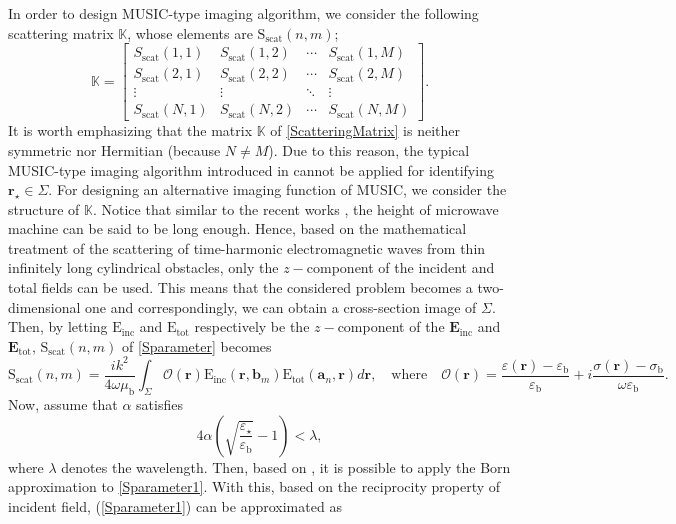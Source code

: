 \documentclass[3p,10pt]{elsarticle}
\newcommand{\eps}{\varepsilon}
\newcommand{\epsb}{\varepsilon_\mathrm{b}}
\newcommand{\mub}{\mu_\mathrm{b}}
\newcommand{\sigmab}{\sigma_\mathrm{b}}
\newcommand{\E}{\mathrm{E}}
\newcommand{\ma}{\mathbf{a}}
\newcommand{\mb}{\mathbf{b}}
\newcommand{\mr}{\mathbf{r}}
\newcommand{\mE}{\mathbf{E}}
\DeclareMathOperator*{\inc}{inc}
\DeclareMathOperator*{\scat}{scat}
\DeclareMathOperator*{\tot}{tot}
\theoremstyle{plain}
\theoremstyle{remark}
\begin{document}
In order to design MUSIC-type imaging algorithm, we consider the following scattering matrix $\mathbb{K}$, whose elements are $\mathrm{S}_{\scat}(n,m)$;
\begin{equation}\label{ScatteringMatrix}
\mathbb{K}=\begin{bmatrix}
S_{\scat}(1,1) & S_{\scat}(1,2) & \cdots & S_{\scat}(1,M) \\
S_{\scat}(2,1) & S_{\scat}(2,2) & \cdots & S_{\scat}(2,M) \\
\vdots & \vdots & \ddots & \vdots \\
S_{\scat}(N,1) & S_{\scat}(N,2) & \cdots & S_{\scat}(N,M)
\end{bmatrix}.
\end{equation}
It is worth emphasizing that the matrix $\mathbb{K}$ of \eqref{ScatteringMatrix} is neither symmetric nor Hermitian (because $N\ne M$). Due to this reason, the typical MUSIC-type imaging algorithm introduced in \cite{AILP,C,D,P-MUSIC6} cannot be applied for identifying $\mr_\star\in\Sigma$. For designing an alternative imaging function of MUSIC, we consider the structure of $\mathbb{K}$. Notice that similar to the recent works \cite{P-MUSIC6,HSM2,P-SUB11,P-SUB16,SSKLJ}, the height of microwave machine can be said to be long enough. Hence, based on the mathematical treatment of the scattering of time-harmonic electromagnetic waves from thin infinitely long cylindrical obstacles, only the $z-$component of the incident and total fields can be used. This means that the considered problem becomes a two-dimensional one and correspondingly, we can obtain a cross-section image of $\Sigma$. Then, by letting $\E_{\inc}$ and $\E_{\tot}$ respectively be the $z-$component of the  $\mE_{\inc}$ and $\mE_{\tot}$, $\mathrm{S}_{\scat}(n,m)$ of \eqref{Sparameter} becomes
\begin{equation}\label{Sparameter1}
\mathrm{S}_{\scat}(n,m)=\frac{ik^2}{4\omega\mub}\int_{\Sigma}\mathcal{O}(\mr)\E_{\inc}(\mr,\mb_m)\E_{\tot}(\ma_n,\mr)d\mr,\quad\text{where}\quad \mathcal{O}(\mr)=\frac{\eps(\mr)-\epsb}{\epsb}+i\frac{\sigma(\mr)-\sigmab}{\omega\epsb}.
\end{equation}
Now, assume that $\alpha$ satisfies
\begin{equation}\label{SmallAnomaly}
4\alpha\left(\sqrt{\frac{\eps_\star}{\epsb}}-1\right)<\lambda,
\end{equation}
where $\lambda$ denotes the wavelength. Then, based on \cite{SKL}, it is possible to apply the Born approximation to \eqref{Sparameter1}. With this, based on the reciprocity property of incident field, (\ref{Sparameter1}) can be approximated as
\end{document}
